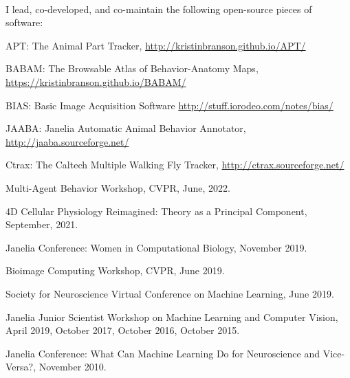 \documentclass[11pt, letterpaper]{awesome-cv}
\begin{document}
%

\vspace{\acvSectionContentTopSkip}
\vspace{2mm}

\vspace{\acvSectionContentTopSkip}

\vspace{\acvSectionContentTopSkip}\\
I lead, co-developed, and co-maintain the following open-source pieces of software:\\
\begin{cvitems}
\item APT: The Animal Part Tracker, \url{http://kristinbranson.github.io/APT/}
  \item BABAM: The Browsable Atlas of Behavior-Anatomy Maps, \url{https://kristinbranson.github.io/BABAM/}
\item BIAS: Basic Image Acquisition Software \url{http://stuff.iorodeo.com/notes/bias/}
\item JAABA: Janelia Automatic Animal Behavior Annotator, \url{http://jaaba.sourceforge.net/}
\item Ctrax: The Caltech Multiple Walking Fly Tracker, \url{http://ctrax.sourceforge.net/}
\end{cvitems}
\vspace{\acvSectionContentTopSkip}

\vspace{\acvSectionContentTopSkip}
\vspace{2mm}
\begin{cvitems}
\item Multi-Agent Behavior Workshop, CVPR, June, 2022. 
\item 4D Cellular Physiology Reimagined: Theory as a Principal Component, September, 2021. 
\item Janelia Conference: Women in Computational Biology, November 2019.
\item Bioimage Computing Workshop, CVPR, June 2019.
\item Society for Neuroscience Virtual Conference on Machine Learning, June 2019.
\item Janelia Junior Scientist Workshop on Machine Learning and Computer Vision, April 2019, October 2017, October 2016, October 2015.
\item Janelia Conference: What Can Machine Learning Do for Neuroscience and Vice-Versa?, November 2010.
\end{cvitems}
\vspace{\acvSectionContentTopSkip}
\end{document}

